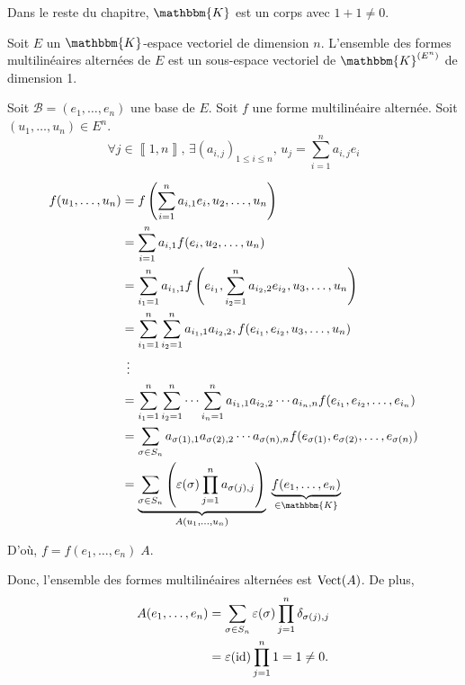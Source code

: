 Dans le reste du chapitre, $\mathbbm{K}$ est un corps avec $1 + 1 \neq 0$.

\begin{thm}
	Soit $E$ un $\mathbbm{K}$-espace vectoriel de dimension $n$. L'ensemble des formes multilinéaires alternées de $E$ est un sous-espace vectoriel de $\mathbbm{K}^{(E^n)}$ de dimension 1.
\end{thm}

\begin{prv}
	Soit $\mathcal{B} = (e_1, \ldots, e_n)$ une base de $E$. Soit $f$ une forme multilinéaire alternée. Soit $(u_1, \ldots, u_n) \in E^n$.
	\[
		\forall j \in \left\llbracket 1,n \right\rrbracket,\, \exists (a_{i,j})_{1\le i\le n},\, u_j = \sum_{i=1}^n a_{i,j} e_i
	\]

	\begin{align*}
		f(u_1, \ldots, u_n) &= f\left( \sum_{i=1}^n a_{i,1} e_i, u_2, \ldots, u_n \right) \\
		&= \sum_{i=1}^n a_{i,1} f(e_i, u_2, \ldots, u_n) \\
		&= \sum_{i_1 = 1}^n a_{i_1,1} f\left( e_{i_1}, \sum_{i_2 = 1}^n a_{i_2,2} e_{i_2}, u_3, \ldots, u_n \right)\\
		&= \sum_{i_1 = 1}^n \sum_{i_2=1}^n a_{i_1,1} a_{i_2,2}, f(e_{i_1}, e_{i_2}, u_3, \ldots,u_n) \\
		&\kern1.5mm\vdots \\
		&= \sum_{i_1=1}^n \sum_{i_2=1}^n \cdots \sum_{i_n = 1}^n a_{i_1,1} a_{i_2,2} \cdots a_{i_n,n} f(e_{i_1}, e_{i_2}, \ldots, e_{i_n})\\
		&= \sum_{\sigma \in S_n} a_{\sigma(1),1} a_{\sigma(2),2} \cdots a_{\sigma(n),n} f(e_{\sigma(1)}, e_{\sigma(2)},\ldots, e_{\sigma(n)}) \\
		&= \underbrace{\sum_{\sigma \in S_n}\left( \varepsilon(\sigma) \prod_{j=1}^n a_{\sigma(j), j} \right)}_{A(u_1, \ldots, u_n)}\; \underbrace{f(e_1, \ldots, e_n)}_{\in \mathbbm{K}}\\
	\end{align*}

	D'où, $f = f(e_1, \ldots, e_n)\;A$.

	Donc, l'ensemble des formes multilinéaires alternées est $\operatorname{Vect}(A)$. De plus,
	\begin{align*}
		A(e_1, \ldots, e_n) &= \sum_{\sigma \in S_n} \varepsilon(\sigma) \prod_{j=1}^n  \delta_{\sigma(j), j} \\
		&= \varepsilon(\operatorname{id}) \prod_{j=1}^n 1 = 1 \neq 0. \\
	\end{align*}
\end{prv}

